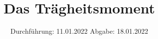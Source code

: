 

\subject{V101}
\title{Das Trägheitsmoment}
\date{%
  Durchführung: 11.01.2022
  \hspace{3em}
  Abgabe: 18.01.2022
}



\maketitle
\thispagestyle{empty}
\tableofcontents
\newpage






\printbibliography{}

%


